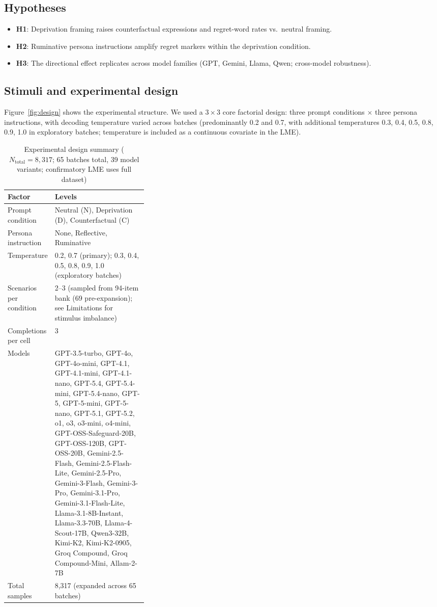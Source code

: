 \documentclass[conference,10pt]{IEEEtran}
\begin{document}
\subsection{Hypotheses}
\begin{itemize}
  \item \textbf{H1}: Deprivation framing raises counterfactual expressions and regret-word rates vs.\ neutral framing.
  \item \textbf{H2}: Ruminative persona instructions amplify regret markers within the deprivation condition.
  \item \textbf{H3}: The directional effect replicates across model families (GPT, Gemini, Llama, Qwen; cross-model robustness).
\end{itemize}

\subsection{Stimuli and experimental design}
Figure~\ref{fig:design} shows the experimental structure.
We used a $3\times3$ core factorial design: three prompt conditions $\times$ three persona instructions, with decoding temperature varied across batches (predominantly 0.2 and 0.7, with additional temperatures 0.3, 0.4, 0.5, 0.8, 0.9, 1.0 in exploratory batches; temperature is included as a continuous covariate in the LME).

\begin{table}[t]
\caption{Experimental design summary ($N_\text{total}=8{,}317$; 65 batches total, 39 model variants; confirmatory LME uses full dataset)}
\label{tab:design}
\footnotesize\centering
\begin{tabularx}{\linewidth}{>{\RaggedRight\arraybackslash}p{0.32\linewidth}X}
\toprule
\rowcolor{tableheader}
\textbf{Factor} & \textbf{Levels} \\
\midrule
Prompt condition & Neutral (N), Deprivation (D), Counterfactual (C) \\
Persona instruction & None, Reflective, Ruminative \\
Temperature & 0.2, 0.7 (primary); 0.3, 0.4, 0.5, 0.8, 0.9, 1.0 (exploratory batches) \\
Scenarios per condition & 2--3 (sampled from 94-item bank (69 pre-expansion); see Limitations for stimulus imbalance) \\
Completions per cell & 3 \\
Models & GPT-3.5-turbo, GPT-4o, GPT-4o-mini, GPT-4.1, GPT-4.1-mini, GPT-4.1-nano, GPT-5.4, GPT-5.4-mini, GPT-5.4-nano, GPT-5, GPT-5-mini, GPT-5-nano, GPT-5.1, GPT-5.2, o1, o3, o3-mini, o4-mini, GPT-OSS-Safeguard-20B, GPT-OSS-120B, GPT-OSS-20B, Gemini-2.5-Flash, Gemini-2.5-Flash-Lite, Gemini-2.5-Pro, Gemini-3-Flash, Gemini-3-Pro, Gemini-3.1-Pro, Gemini-3.1-Flash-Lite, Llama-3.1-8B-Instant, Llama-3.3-70B, Llama-4-Scout-17B, Qwen3-32B, Kimi-K2, Kimi-K2-0905, Groq Compound, Groq Compound-Mini, Allam-2-7B \\
Total samples & 8{,}317 (expanded across 65 batches) \\
\bottomrule
\end{tabularx}
\end{table}
\end{document}
